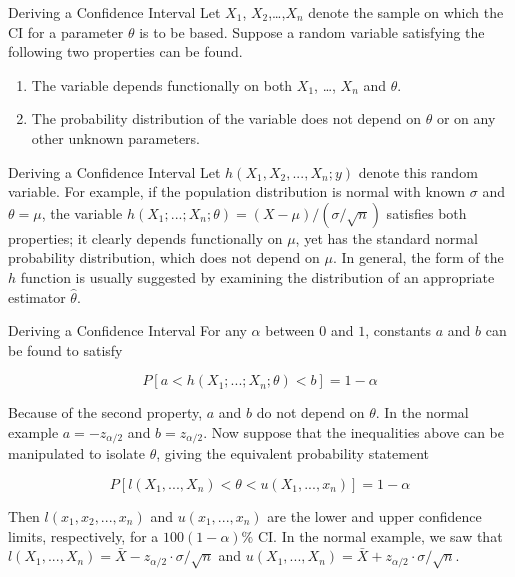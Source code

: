 \documentclass[
  ignorenonframetext,
]{beamer}
\providecommand{\tightlist}{%
  \setlength{\itemsep}{0pt}\setlength{\parskip}{0pt}}\usepackage{longtable,booktabs,array}
\begin{document}
\begin{frame}{Deriving a Confidence Interval}
\protect\hypertarget{deriving-a-confidence-interval}{}
Let \(X_{1}\), \(X_{2}\),\ldots,\(X_{n}\) denote the sample on which the
CI for a parameter \(\theta\) is to be based. Suppose a random variable
satisfying the following two properties can be found.

\begin{enumerate}[<+->]
\tightlist
\item
  The variable depends functionally on both \(X_{1}\), \ldots, \(X_{n}\)
  and \(\theta\).
\item
  The probability distribution of the variable does not depend on
  \(\theta\) or on any other unknown parameters.
\end{enumerate}
\end{frame}

\begin{frame}{Deriving a Confidence Interval}
\protect\hypertarget{deriving-a-confidence-interval-1}{}
Let \(h(X_{1}, X_{2}, ... , X_{n}; y)\) denote this random variable. For
example, if the population distribution is normal with known \(\sigma\)
and \(\theta = \mu\), the variable
\(h(X_{1}; ... ; X_{n}; \theta) = (X - \mu)/(\sigma/\sqrt{n})\)
satisfies both properties; it clearly depends functionally on \(\mu\),
yet has the standard normal probability distribution, which does not
depend on \(\mu\). In general, the form of the \(h\) function is usually
suggested by examining the distribution of an appropriate estimator
\(\hat{\theta}\).
\end{frame}

\begin{frame}{Deriving a Confidence Interval}
\protect\hypertarget{deriving-a-confidence-interval-2}{}
For any \(\alpha\) between \(0\) and \(1\), constants \(a\) and \(b\)
can be found to satisfy

\[
P[a < h(X_{1}; ... ; X_{n}; \theta) < b] = 1  - \alpha
\]

Because of the second property, \(a\) and \(b\) do not depend on
\(\theta\). In the normal example \(a = -z_{\alpha/2}\) and
\(b = z_{\alpha/2}\). Now suppose that the inequalities above can be
manipulated to isolate \(\theta\), giving the equivalent probability
statement

\[
P[l(X_{1},...,X_{n}) < \theta < u(X_{1},...,x_{n})] = 1 - \alpha
\]

Then \(l(x_{1}, x_{2}, ... , x_{n})\) and \(u(x_{1}, ... , x_{n})\) are
the lower and upper confidence limits, respectively, for a
\(100(1 - \alpha)\%\) CI. In the normal example, we saw that
\(l(X_{1}, ..., X_{n}) = \bar{X} - z_{\alpha/2} \cdot \sigma/ \sqrt{n}\)
and
\(u(X_{1}, ..., X_{n}) = \bar{X} + z_{\alpha/2} \cdot \sigma/ \sqrt{n}\).
\end{frame}
\end{document}
